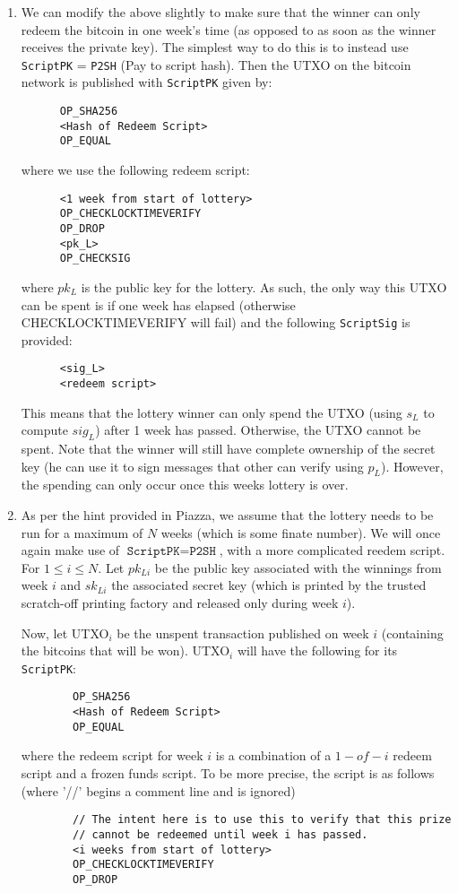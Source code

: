 \documentclass[12pt]{exam}
\begin{document}
\begin{questions}
\begin{solution}
  \begin{enumerate}[label=\textbf{\alph*}.]
    \item We can modify the above slightly to make sure that the winner can only redeem the bitcoin in one week's time (as opposed to as soon as the winner receives the private key). The simplest way to do this is to instead use \texttt{ScriptPK} = \texttt{P2SH} (Pay to script hash). Then the UTXO on the bitcoin network is published with \texttt{ScriptPK} given by:
    \begin{verbatim}
      OP_SHA256
      <Hash of Redeem Script>
      OP_EQUAL
    \end{verbatim}
    where we use the following redeem script:
    \begin{verbatim}
      <1 week from start of lottery>
      OP_CHECKLOCKTIMEVERIFY
      OP_DROP
      <pk_L>
      OP_CHECKSIG
    \end{verbatim}
    where $pk_L$ is the public key for the lottery. As such, the only way this UTXO can be spent is if one week has elapsed (otherwise CHECKLOCKTIMEVERIFY will fail) and the following \texttt{ScriptSig} is provided:
    \begin{verbatim}
      <sig_L>
      <redeem script>
    \end{verbatim}

    This means that the lottery winner can only spend the UTXO (using $s_L$ to compute $sig_L$) after 1 week has passed. Otherwise, the UTXO cannot be spent. Note that the winner will still have complete ownership of the secret key (he can use it to sign messages that other can verify using $p_L$). However, the spending can only occur once this weeks lottery is over.

    \item
      As per the hint provided in Piazza, we assume that the lottery needs to be run for a maximum of $N$ weeks (which is some finate number). We will once again make use of $\texttt{ScriptPK} = \texttt{P2SH}$, with a more complicated reedem script. For $1 \leq i \leq N$. Let $pk_{Li}$ be the public key associated with the winnings from week $i$ and $sk_{Li}$ the associated secret key (which is printed by the trusted scratch-off printing factory and released only during week $i$).

      Now, let UTXO$_i$ be the unspent transaction published on week $i$ (containing the bitcoins that will be won). UTXO$_i$ will have the following for its \texttt{ScriptPK}:
      \begin{verbatim}
        OP_SHA256
        <Hash of Redeem Script>
        OP_EQUAL
      \end{verbatim}
      where the redeem script for week $i$ is a combination of a $1-of-i$ redeem script and a frozen funds script. To be more precise, the script is as follows (where '//' begins a comment line and is ignored)
      \begin{verbatim}
        // The intent here is to use this to verify that this prize
        // cannot be redeemed until week i has passed.
        <i weeks from start of lottery>
        OP_CHECKLOCKTIMEVERIFY
        OP_DROP


\end{verbatim}
\end{enumerate}
\end{solution}
\end{questions}
\end{document}
